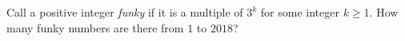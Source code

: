 Call a positive integer \emph{funky} if it is a multiple of $3^k$ for some integer $k\ge1$. How many funky numbers are there from $1$ to $2018$?
